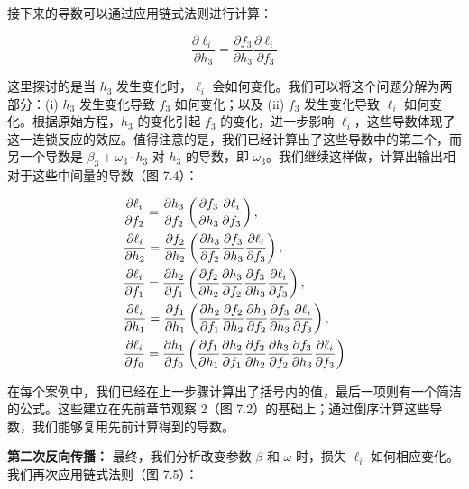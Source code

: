 接下来的导数可以通过应用链式法则进行计算：

\begin{equation}
\frac{\partial \ell_i}{\partial h_3} = \frac{\partial f_3}{\partial h_3} \frac{\partial \ell_i}{\partial f_3} 
\end{equation}

这里探讨的是当 \(h_3\) 发生变化时，\(\ell_i\) 会如何变化。我们可以将这个问题分解为两部分：(i) \(h_3\) 发生变化导致 \(f_3\) 如何变化；以及 (ii) \(f_3\) 发生变化导致 \(\ell_i\) 如何变化。根据原始方程，\(h_3\) 的变化引起 \(f_3\) 的变化，进一步影响 \(\ell_i\)，这些导数体现了这一连锁反应的效应。值得注意的是，我们已经计算出了这些导数中的第二个，而另一个导数是 \(\beta_3 + \omega_3 \cdot h_3\) 对 \(h_3\) 的导数，即 \(\omega_3\)。我们继续这样做，计算出输出相对于这些中间量的导数（图 7.4）：

\begin{align}
&\frac{\partial \ell_i}{\partial f_2} = \frac{\partial h_3}{\partial f_2} \left( \frac{\partial f_3}{\partial h_3} \frac{\partial \ell_i}{\partial f_3} \right), \notag \\
&\frac{\partial \ell_i}{\partial h_2} = \frac{\partial f_2}{\partial h_2} \left( \frac{\partial h_3}{\partial f_2} \frac{\partial f_3}{\partial h_3} \frac{\partial \ell_i}{\partial f_3} \right), \notag \\
&\frac{\partial \ell_i}{\partial f_1} = \frac{\partial h_2}{\partial f_1} \left( \frac{\partial f_2}{\partial h_2} \frac{\partial h_3}{\partial f_2} \frac{\partial f_3}{\partial h_3} \frac{\partial \ell_i}{\partial f_3} \right), \notag \\
&\frac{\partial \ell_i}{\partial h_1} = \frac{\partial f_1}{\partial h_1} \left( \frac{\partial h_2}{\partial f_1} \frac{\partial f_2}{\partial h_2} \frac{\partial h_3}{\partial f_2} \frac{\partial f_3}{\partial h_3} \frac{\partial \ell_i}{\partial f_3} \right), \notag \\
&\frac{\partial \ell_i}{\partial f_0} = \frac{\partial h_1}{\partial f_0} \left( \frac{\partial f_1}{\partial h_1} \frac{\partial h_2}{\partial f_1} \frac{\partial f_2}{\partial h_2} \frac{\partial h_3}{\partial f_2} \frac{\partial f_3}{\partial h_3} \frac{\partial \ell_i}{\partial f_3} \right) 
\end{align}

在每个案例中，我们已经在上一步骤计算出了括号内的值，最后一项则有一个简洁的公式。这些建立在先前章节观察 2（图 7.2）的基础上；通过倒序计算这些导数，我们能够复用先前计算得到的导数。


\textbf{第二次反向传播：} 最终，我们分析改变参数 \(\beta\) 和 \(\omega\) 时，损失 \(\ell_i\) 如何相应变化。我们再次应用链式法则（图 7.5）：

